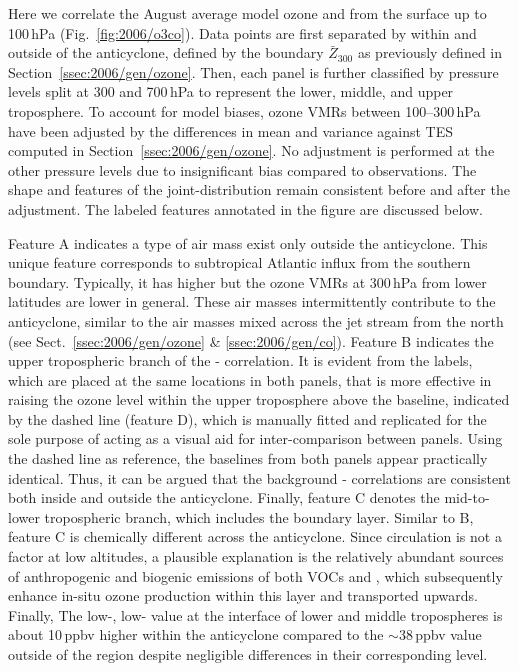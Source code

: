 Here we correlate the August average model ozone and  from the surface up to 100\,\unit{hPa} (Fig.~\ref{fig:2006/o3co}).
Data points are first separated by within and outside of the anticyclone, defined by the boundary $\bar{Z}_{300}$ as previously
defined in Section~\ref{ssec:2006/gen/ozone}. Then, each panel is further classified by pressure levels split at 300 and 700\,\unit{hPa}
to represent the lower, middle, and upper troposphere. To account for model biases, ozone VMRs between 100--300\,\unit{hPa}
have been adjusted by the differences in mean and variance against TES computed in Section~\ref{ssec:2006/gen/ozone}. No
adjustment is performed at the other pressure levels due to insignificant bias compared to observations.
The shape and features of the joint-distribution remain consistent before and after the adjustment. The labeled features annotated
in the figure are discussed below.

Feature A indicates a type of air mass exist only outside the anticyclone. This unique feature corresponds to subtropical Atlantic
influx from the southern boundary. Typically, it has higher  but the ozone VMRs at 300\,\unit{hPa} from lower latitudes are
lower in general. These air masses intermittently contribute to the anticyclone, similar to the air masses mixed across the jet stream
from the north (see Sect.~\ref{ssec:2006/gen/ozone} \& \ref{ssec:2006/gen/co}). Feature B indicates the upper tropospheric branch
of the - correlation. It is evident from the labels, which are placed at the same locations in both panels, that
 is more effective in raising the ozone level within the upper troposphere above the baseline, indicated by the dashed
line (feature D), which is manually fitted and replicated for the sole purpose of acting as a visual aid for inter-comparison between
panels. Using the dashed line as reference, the baselines from both panels appear practically identical. Thus, it can be argued that the background
- correlations are consistent both inside and outside the anticyclone. Finally, feature C denotes the mid-to-lower
tropospheric branch, which includes the boundary layer. Similar to B, feature C is chemically different across the anticyclone. Since circulation
is not a factor at low altitudes, a plausible explanation is the relatively abundant sources of anthropogenic and biogenic emissions of both
VOCs and , which subsequently enhance in-situ ozone production within this layer and transported upwards. Finally,
The low-, low-  value at the interface of lower and middle tropospheres is about 10\,\unit{ppbv} higher within
the anticyclone compared to the $\sim38$\,\unit{ppbv} value outside of the region despite negligible differences in their corresponding
 level.

